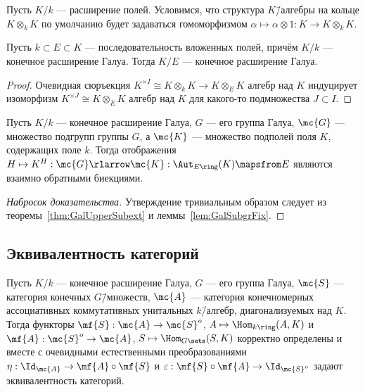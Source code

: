 \documentclass[
	extrafontsizes,
	11pt,
	hyphens,
]{memoir}
\begin{document}
\begin{convention}
Пусть \(K/k\) --- расширение полей. Условимся, что структура \(K\)\=/алгебры на кольце \(K \otimes_k K\) по умолчанию будет задаваться гомоморфизмом \(\alpha \mapsto \alpha \otimes 1 : K \to K \otimes_k K\).
\end{convention}

\begin{theorem}
Пусть \(k \subset E \subset K\) --- последовательность вложенных полей, причём \(K/k\) --- конечное расширение Галуа.%
\label{thm:GalUpperSubext}
Тогда \(K/E\) --- конечное расширение Галуа.
\end{theorem}

\begin{proof}
Очевидная сюръекция \(K^{\times I} \cong K \otimes_k K \to K \otimes_E K\) алгебр над \(K\) индуцирует изоморфизм \(K^{\times J} \cong K \otimes_E K\) алгебр над \(K\) для какого-то подмножества \(J \subset I\).
\end{proof}

\begin{theorem}
Пусть \(K/k\) --- конечное расширение Галуа, \(G\) --- его группа Галуа, \(\mc{G}\) --- множество подгрупп группы \(G\),
а \(\mc{K}\) --- множество подполей поля \(K\), содержащих поле \(k\).
Тогда отображения
\(H \mapsto K^H : \mc{G} \rlarrow \mc{K} : \Aut_{E\ring}(K) \mapsfrom E\)
являются взаимно обратными биекциями.
\end{theorem}

\begin{proof}[Набросок доказательства]
Утверждение тривиальным образом следует из теоремы~\ref{thm:GalUpperSubext}
и леммы~\ref{lem:GalSubgrFix}.
\end{proof}

\subsection{Эквивалентность категорий}

\begin{theorem}
Пусть \(K/k\) --- конечное расширение Галуа,
\(G\) --- его группа Галуа,
\(\mc{S}\) --- категория конечных \(G\)\=/множеств,
\(\mc{A}\) --- категория конечномерных ассоциативных коммутативных унитальных \(k\)\=/алгебр, диагонализуемых над \(K\).
Тогда функторы
\(\mf{S} : \mc{A} \to \mc{S}^o\),
\(A \mapsto \Hom_{k\ring}(A, K)\)
и
\(\mf{A} : \mc{S}^o \to \mc{A}\),
\(S \mapsto \Hom_{G\sets}(S, K)\)
корректно определены и
вместе с очевидными естественными преобразованиями
\(\eta : \Id_{\mc{A}} \to \mf{A} \circ \mf{S}\)
и
\(\varepsilon : \mf{S} \circ \mf{A} \to \Id_{\mc{S}^o}\)
задают эквивалентность категорий.
\end{theorem}
\end{document}
